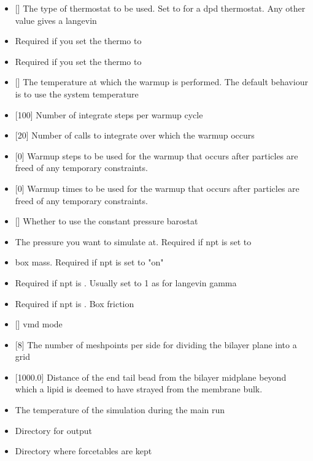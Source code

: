\begin{itemize}
  \item   {} [] The type of thermostat to be used. Set to  for a dpd thermostat. Any other value gives a langevin
  \item {} Required if you set the thermo to 
  \item {} Required if you set the thermo to 
  \item {} [] The temperature at which the warmup is performed. The default behaviour is to use the system temperature
  \item {} [100] Number of integrate steps per warmup cycle
  \item {} [20] Number of calls to integrate over which the warmup occurs
  \item {} [0] Warmup steps to be used for the warmup that occurs after particles are freed of any temporary constraints.
  \item {} [0] Warmup times to be used for the warmup that occurs after particles are freed of any temporary constraints.
    \item {} [] Whether to use the constant pressure barostat
    \item {} The pressure you want to simulate at. Required if npt is set to 
    \item {} box mass. Required if npt is set to "on"
    \item {} Required if npt is . Usually set to 1 as for langevin gamma
    \item {} Required if npt is . Box friction
    \item {} [] vmd mode
    \item {} [8] The number of meshpoints per side for dividing the bilayer plane into a grid
    \item {} [1000.0] Distance of the end tail bead from the bilayer midplane beyond which a lipid is deemed to have strayed from the membrane bulk.
    \item {} The temperature of the simulation during the main run
    \item {} Directory for output
    \item {} Directory where forcetables are kept

\end{itemize}
